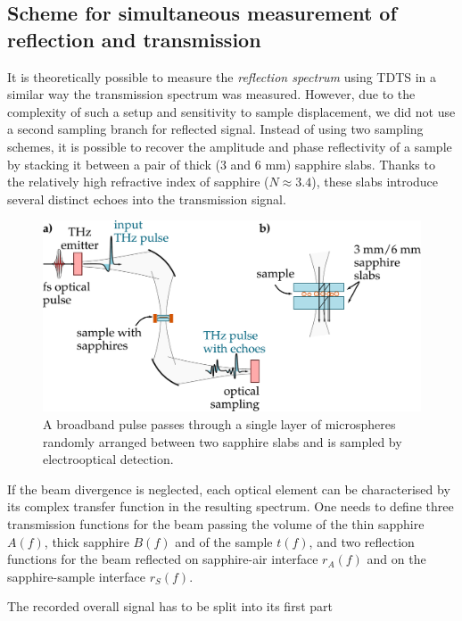 \subsection{Scheme for simultaneous measurement of reflection and transmission}%
It is theoretically possible to measure the \textit{reflection spectrum} using TDTS in a similar way the transmission spectrum was measured. However, due to the complexity of such a setup and sensitivity to sample displacement, we did not use a second sampling branch for reflected signal. Instead of using two sampling schemes, it is possible to recover the amplitude and phase reflectivity of a sample by stacking it between a pair of thick (3 and 6 mm) sapphire slabs. Thanks to the relatively high refractive index of sapphire ($N \approx 3.4$), these slabs introduce several distinct  echoes into the transmission signal.

\begin{figure} \caption{A broadband pulse passes through a single layer of microspheres randomly arranged between two sapphire slabs and is sampled by electrooptical detection.}  \centering \includegraphics[width=12cm]{img/expe/sample_sapphires.pdf} \end{figure} \clearpage

If the beam divergence is neglected, each optical element can be characterised by its complex transfer function in the resulting spectrum. One needs to define three transmission functions for the beam passing the volume of the thin sapphire $A(f)$, thick sapphire $B(f)$ and of the sample $t(f)$, and two reflection functions for the beam reflected on sapphire-air interface $r_{A}(f)$ and on the sapphire-sample interface $r_S(f)$. 

The recorded overall signal has to be split into its first part  %


